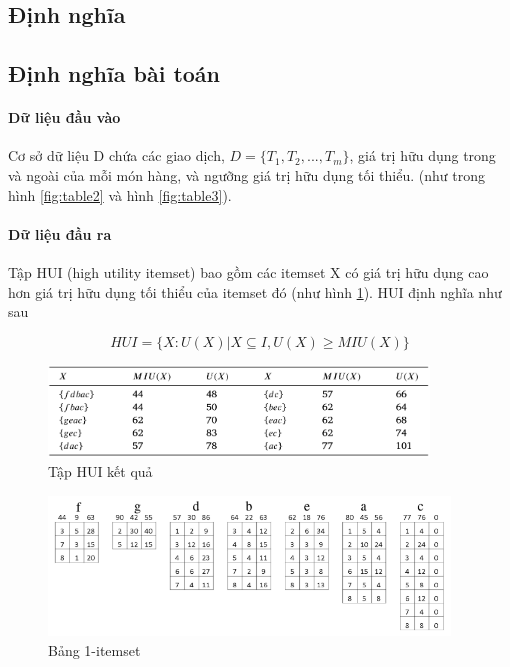 \subsection{Định nghĩa}
 

\subsection{Định nghĩa bài toán}

\paragraph{Dữ liệu đầu vào} Cơ sở dữ liệu D chứa các giao dịch, $D = \{T_1, T_2, ..., T_m\}$, giá trị hữu dụng trong và ngoài của mỗi món hàng, và ngưỡng giá trị hữu dụng tối thiểu. (như trong hình \ref{fig:table2} và hình \ref{fig:table3}).

\paragraph{Dữ liệu đầu ra} Tập HUI (high utility itemset) bao gồm các itemset X có giá trị hữu dụng cao hơn giá trị hữu dụng tối thiểu của itemset đó (như hình \ref{fig:table6}). HUI định nghĩa như sau

$$HUI = \{ X : U(X) | X \subseteq I, U(X) \geq MIU(X) \} $$

\begin{figure}[h]
\centering
\includegraphics[width=0.9\textwidth]{image/table/table6.PNG}
\caption{\label{fig:table6} Tập HUI kết quả}
\end{figure}

\begin{figure}[h]
\centering
\includegraphics[width=0.95\textwidth]{image/algo/1itemset.PNG}
\caption{\label{fig:1itemset} Bảng 1-itemset}
\end{figure}

